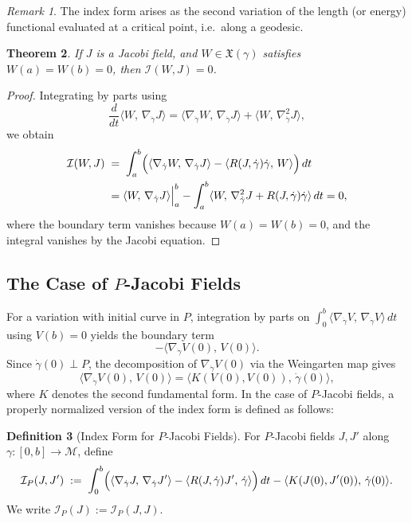 \documentclass[12pt, a4paper]{article}
\theoremstyle{plain}
\newtheorem{theorem}{Theorem}[section]
\theoremstyle{definition}
\newtheorem{definition}[theorem]{Definition}
\theoremstyle{remark}
\newtheorem{remark}[theorem]{Remark}
\newcommand{\M}{\mathcal{M}}
\newcommand{\Ind}{\mathcal{I}}
\newcommand{\ls}[2]{\langle #1,\, #2 \rangle}
\begin{document}
\begin{remark}
  The index form arises as the second variation of the length (or energy) functional
  evaluated at a critical point, i.e.\ along a geodesic.
\end{remark}

\begin{theorem}
\label{thm:index-jacobi}
  If $J$ is a Jacobi field, and $W \in \mathfrak{X}(\gamma)$
  satisfies $W(a) = W(b) = 0$, then $\Ind(W, J) = 0$.
\end{theorem}

\begin{proof}
  Integrating by parts using
  \[
    \frac{d}{dt}\ls{W}{\nabla_{\dot{\gamma}} J}
    = \ls{\nabla_{\dot{\gamma}} W}{\nabla_{\dot{\gamma}} J}
      + \ls{W}{\nabla_{\dot{\gamma}}^2 J},
  \]
  we obtain
  \begin{align*}
    \Ind(W, J) \;&=\;
    \int_a^b \Bigl(\ls{\nabla_{\dot{\gamma}} W}{\nabla_{\dot{\gamma}} J}
      - \ls{R(J,\dot{\gamma})\dot{\gamma}}{W}\Bigr)\,dt \\
    &= \ls{W}{\nabla_{\dot{\gamma}} J}\Bigr|_a^b
      - \int_a^b \ls{W}{\nabla_{\dot{\gamma}}^2 J
        + R(J,\dot{\gamma})\dot{\gamma}}\,dt = 0,
  \end{align*}
  where the boundary term vanishes because $W(a) = W(b) = 0$, and the
  integral vanishes by the Jacobi equation.
\end{proof}

\subsection{The Case of $P$-Jacobi Fields}

For a variation with initial curve in $P$, integration by parts on
$\int_0^b \ls{\nabla_{\dot{\gamma}} V}{\nabla_{\dot{\gamma}} V}\,dt$ using $V(b) = 0$ yields the boundary term
\[
  -\ls{\nabla_{\dot{\gamma}} V(0)}{V(0)}.
\]
Since $\dot{\gamma}(0) \perp P$, the decomposition of $\nabla_{\dot{\gamma}} V(0)$
via the Weingarten map gives
\[
  \ls{\nabla_{\dot{\gamma}} V(0)}{V(0)}
  = \ls{K(V(0),V(0))}{\dot{\gamma}(0)},
\]
where $K$ denotes the second fundamental form. In the case of $P$-Jacobi fields, a properly normalized version of the index form is defined as follows:

\begin{definition}[Index Form for $P$-Jacobi Fields]
  For $P$-Jacobi fields $J, J'$ along $\gamma \colon [0, b] \to \M$, define
  \[
    \Ind_P(J, J') \;:=\;
    \int_0^b \Bigl(\ls{\nabla_{\dot{\gamma}} J}{\nabla_{\dot{\gamma}} J'}
      - \ls{R(J,\dot{\gamma})J'}{\dot{\gamma}}\Bigr)\,dt
    - \ls{K(J(0), J'(0))}{\dot{\gamma}(0)}.
  \]
  We write $\Ind_P(J) := \Ind_P(J, J)$.
\end{definition}
\end{document}

